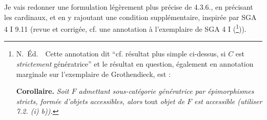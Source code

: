 Je vais redonner une formulation légèrement plus précise de 4.3.6., en précisant les cardinaux, et en y rajoutant une condition supplémentaire, inspirée par SGA 4 I 9.11 (revue et corrigée, cf. une annotation à l'exemplaire de SGA 4 I (\footnote[58]{N.~Éd.\ \ Cette annotation dit “cf. résultat plus simple ci-dessus, si $C$ est \textit{strictement} génératrice” et
le résultat en question, également en annotation marginale sur l'exemplaire de Grothendieck, est :\par
\textbf{Corollaire.} \textit{Soit $F$ admettant} \textit{sous-catégorie génératrice par épimorphismes stricts, formée d'objets accessibles, alors} tout \textit{objet de $F$ est accessible (utiliser 7.2. (i) b)).}})).


